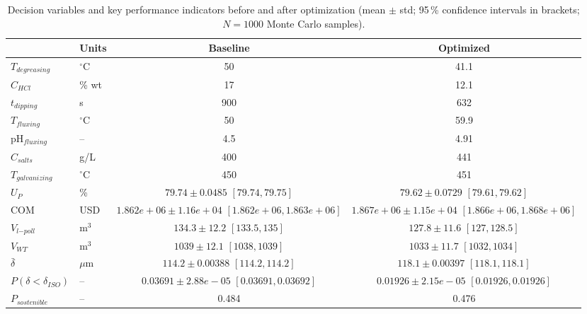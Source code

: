 \begin{table}[htbp]
\centering
\caption{Decision variables and key performance indicators before and after optimization (mean $\pm$ std; 95\,\% confidence intervals in brackets; $N = 1000$ Monte Carlo samples).}
\label{tab:summary}
\begin{tabular}{llcc}
\toprule
 & Units & Baseline & Optimized \\
\midrule
$T_{degreasing}$ & $^{\circ}$C & 50 & 41.1 \\
$C_{HCl}$ & \% wt & 17 & 12.1 \\
$t_{dipping}$ & s & 900 & 632 \\
$T_{fluxing}$ & $^{\circ}$C & 50 & 59.9 \\
pH$_{fluxing}$ & -- & 4.5 & 4.91 \\
$C_{salts}$ & g/L & 400 & 441 \\
$T_{galvanizing}$ & $^{\circ}$C & 450 & 451 \\
\midrule
$U_P$ & \% & $79.74 \pm 0.0485$ $[79.74, 79.75]$ & $79.62 \pm 0.0729$ $[79.61, 79.62]$ \\
COM & USD & $1.862e+06 \pm 1.16e+04$ $[1.862e+06, 1.863e+06]$ & $1.867e+06 \pm 1.15e+04$ $[1.866e+06, 1.868e+06]$ \\
$V_{l\mathrm{-}poll}$ & m$^3$ & $134.3 \pm 12.2$ $[133.5, 135]$ & $127.8 \pm 11.6$ $[127, 128.5]$ \\
$V_{WT}$ & m$^3$ & $1039 \pm 12.1$ $[1038, 1039]$ & $1033 \pm 11.7$ $[1032, 1034]$ \\
$\bar{\delta}$ & $\mu$m & $114.2 \pm 0.00388$ $[114.2, 114.2]$ & $118.1 \pm 0.00397$ $[118.1, 118.1]$ \\
$P(\delta < \delta_{ISO})$ & -- & $0.03691 \pm 2.88e-05$ $[0.03691, 0.03692]$ & $0.01926 \pm 2.15e-05$ $[0.01926, 0.01926]$ \\
\midrule
$P_{sostenible}$ & -- & 0.484 & 0.476 \\
\bottomrule
\end{tabular}
\end{table}
